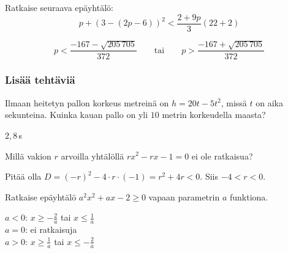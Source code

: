 \begin{tehtavasivu}
\begin{tehtava}
    Ratkaise seuraava epäyhtälö:
    $$p+(3-(2p-6))^2<\dfrac{2+9p}{3}(22+2)$$
    \begin{vastaus}
        $$p<\dfrac{-167-\sqrt{205\,705}}{372} \qquad\text{tai}\qquad p>\dfrac{-167+\sqrt{205\,705}}{372}$$
    \end{vastaus}
\end{tehtava}

\subsubsection*{Lisää tehtäviä}

\begin{tehtava}
Ilmaan heitetyn pallon korkeus metreinä on $h=20t-5t^2$, missä $t$ on aika sekunteina. Kuinka kauan pallo on yli $10$ metrin korkeudella maasta?
    \begin{vastaus}
	$2,8$\,s
    \end{vastaus}
\end{tehtava}

\begin{tehtava}
	Millä vakion $r$ arvoilla yhtälöllä $rx^2-rx-1 = 0$ ei ole ratkaisua?
	\begin{vastaus}
		Pitää olla $D=(-r)^2-4 \cdot r \cdot (-1)=r^2+4r<0$. Siis $-4 < r < 0$.
	\end{vastaus}
\end{tehtava}

\begin{tehtava}
    Ratkaise epäyhtälö $a^2x^2+ax-2 \geq 0$ vapaan parametrin $a$ funktiona.
    \begin{vastaus}
        $a < 0$: $x \geq -\frac{2}{a}$ tai $x \leq \frac{1}{a}$ \\ $a = 0$: ei ratkaisuja \\ $a > 0$: $x \geq \frac{1}{a}$ tai $x \leq -\frac{2}{a}$
    \end{vastaus}
\end{tehtava}

\end{tehtavasivu}